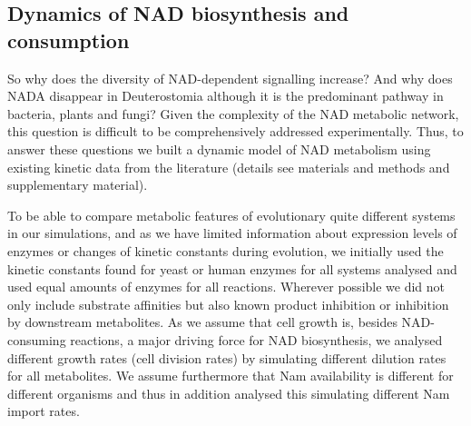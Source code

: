 \subsection{Dynamics of NAD biosynthesis and consumption}

So why does the diversity of NAD-dependent signalling increase? And why does NADA disappear in Deuterostomia although it is the predominant pathway in bacteria, plants and fungi? Given the complexity of the NAD metabolic network, this question is difficult to be comprehensively addressed experimentally. Thus, to answer these questions we built a dynamic model of NAD metabolism using existing kinetic data from the literature (details see materials and methods and supplementary material).

To be able to compare metabolic features of evolutionary quite different systems in our simulations, and as we have limited information about expression levels of enzymes or changes of kinetic constants during evolution, we initially used the kinetic constants found for yeast or human enzymes for all systems analysed and used equal amounts of enzymes for all reactions. Wherever possible we did not only include substrate affinities but also known product inhibition or inhibition by downstream metabolites. As we assume that cell growth is, besides NAD-consuming reactions, a major driving force for NAD biosynthesis, we analysed different growth rates (cell division rates) by simulating different dilution rates for all metabolites. We assume furthermore that Nam availability is different for different organisms and thus in addition analysed this simulating different Nam import rates.

